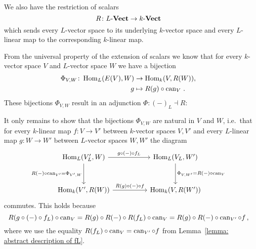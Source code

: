 \begin{remark}
  \label{remark: adjointness of extension and restriction}
  We also have the restriction of scalars
  \[
            R
    \colon  L\text{-}\mathbf{Vect}
    \to     k\text{-}\mathbf{Vect}
  \]
  which sends every $L$-vector space to its underlying $k$-vector space and every $L$-linear map to the corresponding $k$-linear map.
    
  From the universal property of the extension of scalars we know that for every $k$-vector space $V$ and $L$-vector space $W$ we have a bijection
  \begin{align*}
              \Phi_{V,W}
     \colon   \operatorname{Hom}_L(E(V),W)
    &\to      \operatorname{Hom}_k(V,R(W)), \\
              g
    &\mapsto  R(g) \circ \operatorname{can}_V \,.
  \end{align*}
  These bijections $\Phi_{V,W}$ result in an adjunction $\Phi \colon (-)_L \dashv R$:
  
  It only remains to show that the bijections $\Phi_{V,W}$ are natural in $V$ and $W$, i.e.\ that for every $k$-linear map $f \colon V \to V'$ between $k$-vector spaces $V, V'$ and every $L$-linear map $g \colon W \to W'$ between $L$-vector spaces $W, W'$ the diagram
  \[
    \begin{tikzcd}[row sep = 3em, column sep = 5em]
        \Hom_L(V'_L, W)
        \arrow{r}[above]{g \circ (-) \circ f_L}
        \arrow{d}[left]{R(-) \circ \can_{V'} = \Phi_{V',W}}
      & \Hom_L(V_L, W')
        \arrow{d}[right]{\Phi_{V,W'} = R(-) \circ \can_V}
      \\
        \Hom_k(V', R(W))
        \arrow{r}[above]{R(g) \circ (-) \circ f}
      & \Hom_k(V, R(W'))
    \end{tikzcd}
  \]
  commutes.
  This holds because
  \[
      R(g \circ (-) \circ f_L) \circ \operatorname{can}_V
    = R(g) \circ R(-) \circ R(f_L) \circ \operatorname{can}_V
    = R(g) \circ R(-) \circ \operatorname{can}_{V'} \circ f \,,
  \]
  where we use the equality $R(f_L) \circ \operatorname{can}_V = \operatorname{can}_{V'} \circ f$ from Lemma~\ref{lemma: abstract description of fL}.
\end{remark}
